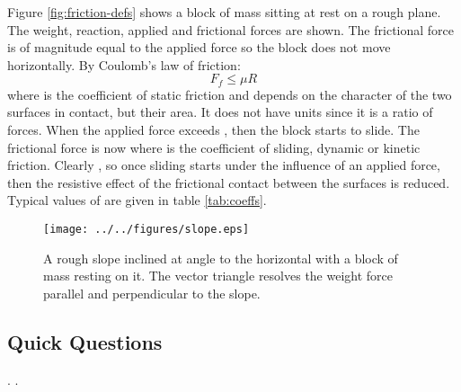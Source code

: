 \vspace{-.3cm}
Figure \ref{fig:friction-defs} shows a block of mass  sitting at rest on a rough plane. The weight, reaction, applied and frictional forces are shown.  The frictional force is of magnitude  equal to the applied force so the block does not move horizontally.  By Coulomb's law of friction:
 \begin{equation*} F_f  \le \mu R
\end{equation*}
where \vari{\mu} is the coefficient of static friction and depends on the character of the two surfaces in contact, but  their area.  It does not have units since it is a ratio  of forces.
\nll
When the applied force exceeds , then the block starts to slide.  The frictional force is now  where  is the coefficient of sliding, dynamic or kinetic friction.  Clearly , so once sliding starts under the influence of an applied force, then the resistive effect of the frictional contact between the surfaces is reduced.  Typical values of \vari{\mu} are given in table \ref{tab:coeffs}.

\begin{wrapfigure}{r}{7cm}\vspace{-1.3cm}
\center
\texttt{[image: ../../figures/slope.eps]}
\caption{A rough slope inclined at angle \vari{\theta} to the horizontal with a block of mass  resting on it.  The vector triangle resolves the weight force parallel and perpendicular to the slope.}\label{fig:slope}
\end{wrapfigure}

\subsection*{Quick Questions}
\nl
{} {.}\nl
{} {.}

